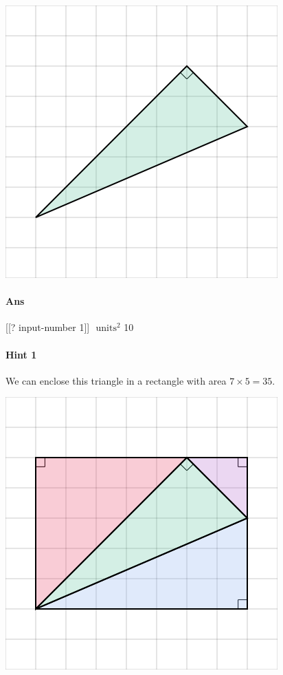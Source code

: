 \documentclass[twocolumn,10pt]{article}
\def\shrinkfactor{0.55}
\begin{document}
\includegraphics[scale=\shrinkfactor]{figures/992f3f54101ec07ac574037aa344e1713ad8143d.png}

\paragraph{Ans} [[? input-number 1]] $\text{ units}^2$  10

\paragraph{Hint 1}We can enclose this triangle in a rectangle with area $7 \times 5 =35$.   

\includegraphics[scale=\shrinkfactor]{figures/bd87687fd50cd1ccc88ac38f14b4f8289e2cb00b.png}  
\end{document}
